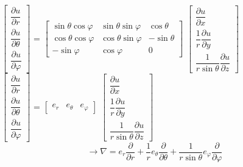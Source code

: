\begin{frame}
	\small {$
		\left[\begin{array}{ccc}
			\dfrac{\partial u}{\partial r} \\
			\dfrac{\partial u}{\partial \theta} \\
			\dfrac{\partial u}{\partial \varphi}
		\end{array}\right]$
		=
		$\left[\begin{array}{ccc}
			\sin \theta \cos \varphi & \sin \theta \sin \varphi & \cos \theta \\
			\cos \theta \cos \varphi &  \cos \theta \sin \varphi & - \sin \theta \\
			- \sin \varphi & \cos \varphi & 0
		\end{array}\right]$
		$\left[\begin{array}{ccc}
			\dfrac{\partial u}{\partial x} \\
			\dfrac{1}{r}\dfrac{\partial u}{\partial y} \\
			\dfrac{1}{r \sin \theta}\dfrac{\partial u}{\partial z}
		\end{array}\right]
		$}	\\ \vspace{0.3cm}
	\small {$
		\left[\begin{array}{ccc}
			\dfrac{\partial u}{\partial r} \\
			\dfrac{\partial u}{\partial \theta} \\
			\dfrac{\partial u}{\partial \varphi}
		\end{array}\right]$
		=
		$\left[\begin{array}{ccc}
			{e_r}&  {e_\theta} & {e_\varphi}
		\end{array}\right]$
		$\left[\begin{array}{ccc}
			\dfrac{\partial u}{\partial x} \\
			\dfrac{1}{r}\dfrac{\partial u}{\partial y} \\
			\dfrac{1}{r \sin \theta}\dfrac{\partial u}{\partial z}
		\end{array}\right]
		$}	\\
	\begin{equation*}
		\to	\nabla=e_{r} \frac{\partial}{\partial r}+\frac{1}{r} e_{\theta} \frac{\partial}{\partial \theta}+\frac{1}{r \sin \theta} e_{\varphi} \frac{\partial}{\partial \varphi}
	\end{equation*}
\end{frame}	

